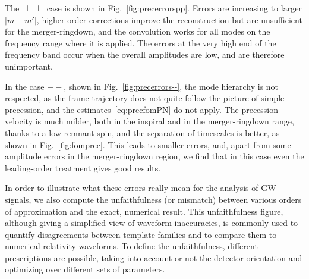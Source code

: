 \documentclass[aps,showpacs,twocolumn,
prd,superscriptaddress,nofootinbib]{revtex4-1}
\begin{document}
The $\perp\perp$ case is shown in Fig.~\ref{fig:precerrorspp}. Errors are increasing to larger $|m-m'|$, higher-order corrections improve the reconstruction but are unsufficient for the merger-ringdown, and the convolution works for all modes on the frequency range where it is applied. The errors at the very high end of the frequency band occur when the overall amplitudes are low, and are therefore unimportant. 

In the case $--$, shown in Fig.~\ref{fig:precerrors--}, the mode hierarchy is not respected, as the frame trajectory does not quite follow the picture of simple precession, and the estimates~\eqref{eq:precfomPN} do not apply. The precession velocity is much milder, both in the inspiral and in the merger-ringdown range, thanks to a low remnant spin, and the separation of timescales is better, as shown in Fig.~\ref{fig:fomprec}. This leads to smaller errors, and, apart from some amplitude errors in the merger-ringdown region, we find that in this case even the leading-order treatment gives good results.

In order to illustrate what these errors really mean for the analysis of GW signals, we also compute the unfaithfulness (or mismatch) between various orders of approximation and the exact, numerical result. This unfaithfulness figure, although giving a simplified view of waveform inaccuracies, is commonly used to quantify disagreements between template families and to compare them to numerical relativity waveforms. To define the unfaithfulness, different prescriptions are possible, taking into account or not the detector orientation and optimizing over different sets of parameters.
\end{document}
